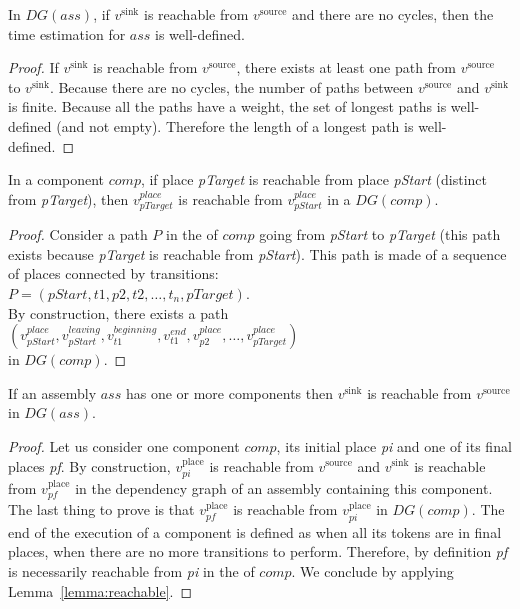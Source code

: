 \begin{lemma}
 In $DG(ass)$, if $v^\text{sink}$ is reachable from $v^\text{source}$ and there
 are no cycles, then the time estimation for $ass$ is well-defined.
 \label{lemma:well_defined}
\end{lemma}

\begin{proof}
 If $v^\text{sink}$ is reachable from $v^\text{source}$, there exists at least
 one path from $v^\text{source}$ to  $v^\text{sink}$. Because there are no
 cycles, the number of paths between $v^\text{source}$ and $v^\text{sink}$ is
 finite. Because all the paths have a weight, the set of longest paths is
 well-defined (and not empty). Therefore the length of a longest path is
 well-defined.
\end{proof}

\begin{lemma}
 In a component $comp$, if place \emph{pTarget} is reachable from place
 \emph{pStart} (distinct from \emph{pTarget}), then $v_{pTarget}^{place}$
 is reachable from $v_{pStart}^{place}$ in a $DG(comp)$.
 \label{lemma:reachable}
\end{lemma}

\begin{proof}
 Consider a path $P$ in the \net of $comp$ going from \emph{pStart} to
 \emph{pTarget} (this path exists because \emph{pTarget} is reachable from
 \emph{pStart}). This path is made of a sequence of places connected by
 transitions:\\
 $P=(pStart,t1,p2,t2,\dots,t_n,pTarget)$.\\
 By construction, there exists a path\\
 $(v_{pStart}^{place},v_{pStart}^{leaving},v_{t1}^{beginning},v_{t1}^{end},v_{p2}^{place},\dots,v_{pTarget}^{place})$\\
 in $DG(comp)$.
\end{proof}


\begin{lemma}
 If an assembly $ass$ has one or more components then $v^\text{sink}$ is
 reachable from $v^\text{source}$ in $DG(ass)$.
 \label{lemma:source_sink}
\end{lemma}

\begin{proof}
 Let us consider one component $comp$, its initial place \emph{pi} and one of
 its final places \emph{pf}. By construction, $v_{pi}^\text{place}$ is
 reachable from $v^\text{source}$ and $v^\text{sink}$ is reachable from
 $v_{pf}^\text{place}$ in the dependency graph of an assembly containing this
 component. The last thing to prove is that $v_{pf}^\text{place}$ is reachable
 from $v_{pi}^\text{place}$ in $DG(comp)$.
 The end of the execution of a \mad component is defined as
 when all its tokens are in final places, \ie when there are no more
 transitions to perform. Therefore, by definition \emph{pf} is
 necessarily reachable from \emph{pi} in the \net of $comp$.
 We conclude by applying Lemma~\ref{lemma:reachable}.
\end{proof}

